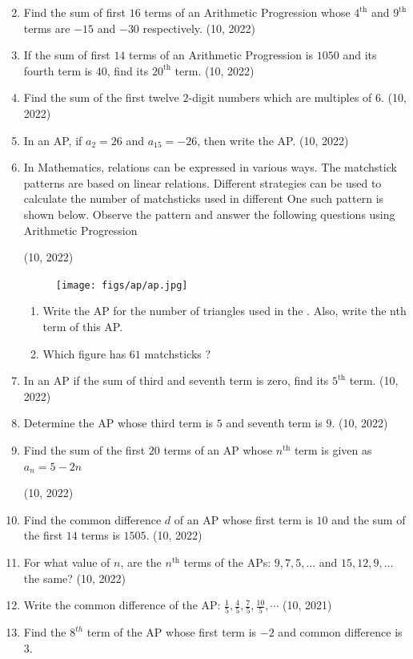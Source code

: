 \begin{enumerate}[label=\thesubsection.\arabic*,ref=\thesubsection.\theenumi,itemsep=1pt]
\begin{multicols}{4}
\end{multicols}
 \item Find the sum of first $16$ terms of an Arithmetic Progression whose $4^{\text{th}}$ and $9^{\text{th}}$ terms are $-15$ and $-30$ respectively.
        \hfill (10,  2022) \item If the sum of first $14$ terms of an Arithmetic Progression is $1050$ and its fourth term is $40$, find its $20^{\text{th}}$ term.
\hfill (10,  2022)
         \item Find the sum of the first twelve $2$-digit numbers which are 
multiples of $6$.
\hfill (10,  2022)
         \item In an AP, if $a_2=26$ and $a_{15} = -26$, then write the AP.
\hfill (10,  2022)
         \item In Mathematics, relations can be expressed in various ways. The 
matchstick patterns are based on linear relations. Different strategies 
can be used to calculate the number of matchsticks used in different 
One such pattern is shown below. Observe the pattern and answer the 
following questions using Arithmetic Progression 

    \hfill (10,  2022) 
\begin{figure}[H]
    \centering
	\texttt{[image: figs/ap/ap.jpg]}
	\caption{}
    \label{fig:ap}
\end{figure}
    \begin{enumerate}
	 \item Write the AP for the number of triangles used in the . Also, 
write the nth term of this AP.
 \item Which figure has $61$ matchsticks ? 
    \end{enumerate} 
 \item In an AP if the sum of third and seventh term is zero, find its $5^{\text{th}}$ term.
        \hfill (10,  2022)
  \item Determine the AP whose third term is $5$ and seventh term is $9$.
        \hfill (10,  2022) \item Find the sum of the first $20$ terms of an AP whose $n^{\text{th}}$ term is given as $a_n=5-2n$

%
        \hfill (10,  2022) \item Find the common difference $d$ of an AP whose first term is $10$ and the sum of the first $14$ terms is $1505$.
        \hfill (10,  2022) \item For what value of $n$, are the $n^{\text{th}}$ terms of the APs: $9,7,5,\dots$ and $15,12,9,\dots$ the same?
    \hfill (10,  2022)
	 \item Write the common difference of the AP: $\frac{1}{5}, \frac{4}{5}, \frac{7}{5}, \frac{10}{5}, \cdots$
	\hfill (10,  2021) \item Find the $8^{th}$ term of the AP whose first term is $-2$ and common difference is $3$.


\end{enumerate}
